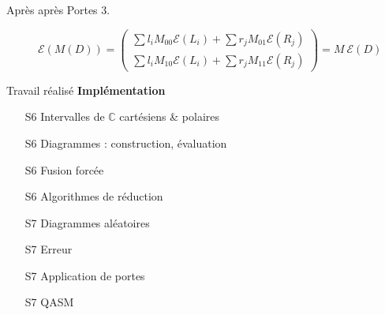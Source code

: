 \begin{frame}{Après après Portes}
  \Huge \color{cs}3.\color{black}\normalsize
  \begin{figure}[H]
    \centering

    \begingroup
    \renewcommand*{\arraystretch}{1.5}
        $$\mathcal E(M(D)) = \begin{pmatrix}
  \sum l_i M_{00} \mathcal E (L_i) + \sum r_j M_{01} \mathcal E (R_j) \\
  \sum l_i M_{10} \mathcal E (L_i) + \sum r_j M_{11} \mathcal E (R_j)
\end{pmatrix} = M ~ \mathcal E (D)$$
\endgroup
    \end{figure}
\end{frame}

\begin{frame}{Travail réalisé}
  \textbf{Implémentation}
  \begin{itemize}
      \item[S6] Intervalles de $\mathbb C$ cartésiens \& polaires
      \item[S6] Diagrammes : construction, évaluation
      \item[S6] Fusion forcée
      \item[S6] Algorithmes de réduction
      \item[S7] Diagrammes aléatoires
      \item[S7] Erreur
      \item[S7] Application de portes
      \item[S7] QASM
  \end{itemize}
\end{frame}
